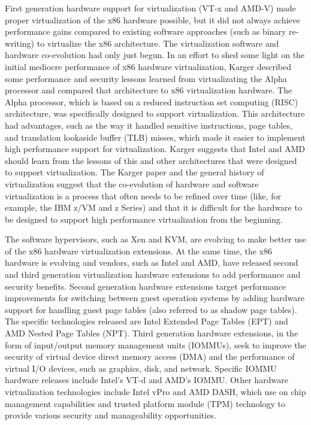First generation hardware support for virtualization (VT-x and AMD-V) made proper virtualization\cite{popek_1974} of the x86 hardware possible, but it did not always achieve performance gains compared to existing software approaches (such as binary re-writing) to virtualize the x86 architecture\cite{adams_2006}. The virtualization software and hardware co-evolution had only just begun. In an effort to shed some light on the initial mediocre performance of x86 hardware virtualization, Karger\cite{karger_2007} described some performance and security lessons learned from virtualizating the Alpha processor and compared that architecture to x86 virtualization hardware. The Alpha processor, which is based on a reduced instruction set computing (RISC) architecture, was specifically designed to support virtualization. This architecture had advantages, such as the way it handled sensitive instructions, page tables, and translation lookaside buffer (TLB) misses, which made it easier to implement high performance support for virtualization. Karger suggests that Intel and AMD should learn from the lessons of this and other architectures that were designed to support virtualization. The Karger paper and the general history of virtualization suggest that the co-evolution of hardware and software virtualization is a process that often needs to be refined over time (like, for example, the IBM z/VM and z Series) and that it is difficult for the hardware to be designed to support high performance virtualization from the beginning.

The software hypervisors, such as Xen and KVM, are evolving to make better use of the x86 hardware virtualization extensions. At the same time, the x86 hardware is evolving and vendors, such as Intel and AMD, have released second and third generation virtualization hardware extensions to add performance and security benefits. Second generation hardware extensions target performance improvements for switching between guest operation systems by adding hardware support for handling guest page tables (also referred to as shadow page tables). The specific technologies released are Intel Extended Page Tables (EPT) and AMD Nested Page Tables (NPT). Third generation hardware extensions, in the form of input/output memory management units (IOMMUs), seek to improve the security of virtual device direct memory access (DMA) and the performance of virtual I/O devices, such as graphics, disk, and network. Specific IOMMU hardware releases include Intel's VT-d and AMD's IOMMU. Other hardware virtualization technologies include Intel vPro and AMD DASH, which use on chip management capabilities and trusted platform module (TPM) technology to provide various security and manageability opportunities.

